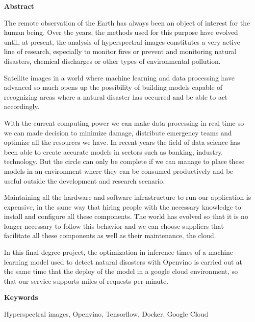 \begin{center}
{\bf \Huge Abstract}

\end{center}

The remote observation of the Earth has always been an object of interest for the human being.
Over the years, the methods used for this purpose have evolved until, at present, the analysis of hyperspectral images constitutes a very active line of research, especially
to monitor fires or prevent and monitoring natural disasters, chemical discharges or other types of environmental pollution.

Satellite images in a world where machine learning and data processing have advanced so much opens up the possibility of building models capable of recognizing areas where a natural
disaster has occurred and be able to act accordingly.

With the current computing power we can make data processing in real time so we can made decision to minimize damage, distribute emergency teams and optimize all the resources we have.
In recent years the field of data science has been able to create accurate models in sectors such as banking, industry, technology.
But the circle can only be complete if we can manage to place these models in an environment where they can be consumed productively and be useful outside the development and research scenario.

Maintaining all the hardware and software infrastructure to run our application is expensive, in the same way that hiring people with the necessary
knowledge to install and configure all these components.
The world has evolved so that it is no longer necessary to follow this behavior and we can choose suppliers that facilitate all these components as well as their maintenance, the cloud.

In this final degree project, the optimization in inference times of a machine learning model used to detect natural disasters with Openvino is carried out at the same time that the
deploy of the model in a google cloud environment, so that our service supports miles of requests per minute.

\vspace{0.8cm}
\begin{center}

{\bf \Large Keywords}

\end{center}


Hyperspectral images, Openvino, Tensorflow, Docker, Google Cloud
\vspace{0.5cm}

\mbox{}
